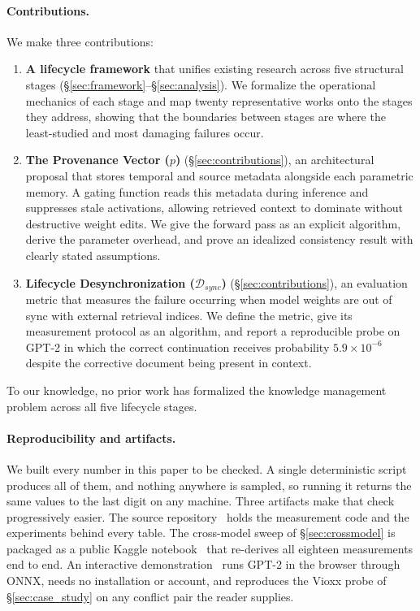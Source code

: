 \documentclass[10pt]{article}
\newcommand{\citecode}{\citep{anon2026code}}
\newcommand{\citenotebook}{\citep{anon2026notebook}}
\newcommand{\citedemo}{\citep{anon2026demo}}
\newcommand{\citecode}{\citep{thakur2026code}}
\newcommand{\citenotebook}{\citep{thakur2026notebook}}
\newcommand{\citedemo}{\citep{thakur2026demo}}
\begin{document}
\paragraph{Contributions.} We make three contributions:

\begin{enumerate}[leftmargin=*]
  \item \textbf{A lifecycle framework} that unifies existing research across five structural stages (\S\ref{sec:framework}--\S\ref{sec:analysis}). We formalize the operational mechanics of each stage and map twenty representative works onto the stages they address, showing that the boundaries between stages are where the least-studied and most damaging failures occur.

  \item \textbf{The Provenance Vector ($p$)} (\S\ref{sec:contributions}), an architectural proposal that stores temporal and source metadata alongside each parametric memory. A gating function reads this metadata during inference and suppresses stale activations, allowing retrieved context to dominate without destructive weight edits. We give the forward pass as an explicit algorithm, derive the parameter overhead, and prove an idealized consistency result with clearly stated assumptions.

  \item \textbf{Lifecycle Desynchronization ($\mathcal{D}_{sync}$)} (\S\ref{sec:contributions}), an evaluation metric that measures the failure occurring when model weights are out of sync with external retrieval indices. We define the metric, give its measurement protocol as an algorithm, and report a reproducible probe on GPT-2 in which the correct continuation receives probability $5.9 \times 10^{-6}$ despite the corrective document being present in context.
\end{enumerate}

To our knowledge, no prior work has formalized the knowledge management problem across all five lifecycle stages.

\paragraph{Reproducibility and artifacts.} We built every number in this paper to be checked. A single deterministic script produces all of them, and nothing anywhere is sampled, so running it returns the same values to the last digit on any machine. Three artifacts make that check progressively easier. The source repository~\citecode{} holds the measurement code and the experiments behind every table. The cross-model sweep of \S\ref{sec:crossmodel} is packaged as a public Kaggle notebook~\citenotebook{} that re-derives all eighteen measurements end to end. An interactive demonstration~\citedemo{} runs GPT-2 in the browser through ONNX, needs no installation or account, and reproduces the Vioxx probe of \S\ref{sec:case_study} on any conflict pair the reader supplies.
\end{document}
